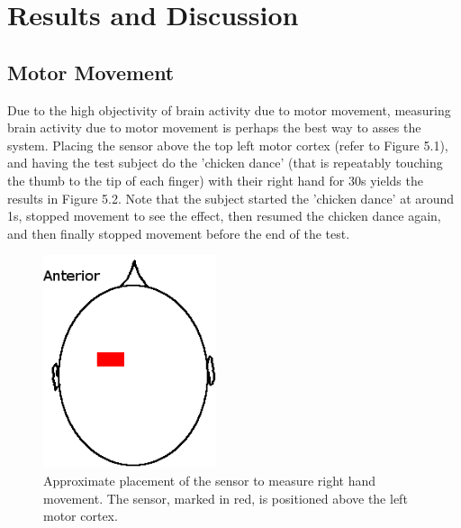 \chapter{Results and Discussion}

\section{Motor Movement}
Due to the high objectivity of brain activity due to motor movement, measuring brain activity due to motor movement is perhaps the best way to asses the system. Placing the sensor above the top left motor cortex (refer to Figure 5.1), and having the test subject do the 'chicken dance' (that is repeatably touching the thumb to the tip of each finger) with their right hand for 30s yields the results in Figure 5.2. Note that the subject started the 'chicken dance' at around 1s, stopped movement to see the effect, then resumed the chicken dance again, and then finally stopped movement before the end of the test.

\begin{figure}[htp]
\centering
\includegraphics[width=2in]{motorsens.png}
\caption[Placement of Sensor to Measure Right Hand Movement]{Approximate placement of the sensor to measure right hand movement. The sensor, marked in red, is positioned above the left motor cortex.}
\end{figure}

